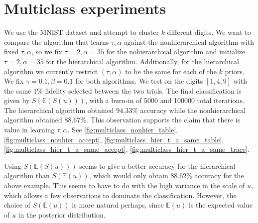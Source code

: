 \documentclass{siamart1116}
\begin{document}
\section{Multiclass experiments} \label{sec:Multiclass experiments}
    We use the MNIST dataset and attempt to cluster $k$ different digits. We want to compare the algorithm that learns $\tau, \alpha$ against the nonhierarchical algorithm with fixed $\tau, \alpha$, so we fix $\tau=2, \alpha=35$ for the nohierarchical algorithm and initialize $\tau=2, \alpha=35$ for the hierarchical algorithm. Additionally, for the hierarchical algorithm we currently restrict $(\tau,\alpha)$ to be the same for each of the $k$ priors. We fix $\gamma = 0.1, \beta = 0.1$ for both algorithms. We test on the digits $[1, 4, 9]$ with the same $1\%$ fidelity selected between the two trials. The final classification is given by $S(\mathbb{E}(S(u)))$, with a burn-in of 5000 and 100000 total iterations. The hierarchical algorithm obtained $94.33\%$ accuracy while the nonhierarchical algorithm obtained $88.67\%$. This observation supports the claim that there is value in learning $\tau, \alpha$. See \cref{fig:multiclass_nonhier_table}, \cref{fig:multiclass_nonhier_accept}, \cref{fig:multiclass_hier_t_a_same_table}, \cref{fig:multiclass_hier_t_a_same_accept}, \cref{fig:multiclass_hier_t_a_same_trace}.

    Using $S(\mathbb{E}(S(u)))$ seems to give a better accuracy for the hierarchical algorithm than $S(\mathbb{E}(u))$, which would only obtain $88.62\%$ accuracy for the above example. This seems to have to do with the high variance in the scale of $u$, which allows a few observations to dominate the classification. However, the choice of $S(\mathbb{E}(u))$ is more natural perhaps, since $\mathbb{E}(u)$ is the expected value of $u$ in the posterior distribution.
\end{document}
